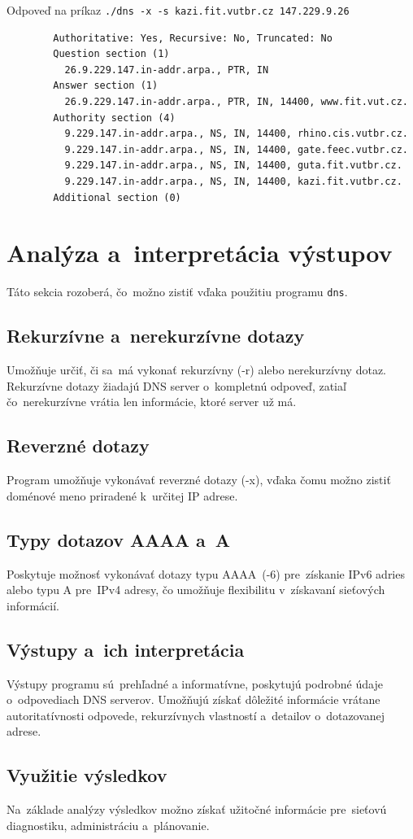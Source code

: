 \documentclass[a4paper, 11pt]{article}
\begin{document}
	\noindent Odpoveď na príkaz \texttt{./dns -x -s kazi.fit.vutbr.cz 147.229.9.26}
	\begin{verbatim}
		Authoritative: Yes, Recursive: No, Truncated: No
		Question section (1)
		  26.9.229.147.in-addr.arpa., PTR, IN
		Answer section (1)
		  26.9.229.147.in-addr.arpa., PTR, IN, 14400, www.fit.vut.cz.
		Authority section (4)
		  9.229.147.in-addr.arpa., NS, IN, 14400, rhino.cis.vutbr.cz.
		  9.229.147.in-addr.arpa., NS, IN, 14400, gate.feec.vutbr.cz.
		  9.229.147.in-addr.arpa., NS, IN, 14400, guta.fit.vutbr.cz.
		  9.229.147.in-addr.arpa., NS, IN, 14400, kazi.fit.vutbr.cz.
		Additional section (0)
	\end{verbatim}
	
	\section{Analýza a~interpretácia výstupov}
	Táto sekcia rozoberá, čo~možno zistiť vďaka použitiu programu \texttt{dns}.
	\subsection{Rekurzívne a~nerekurzívne dotazy}
	Umožňuje určiť, či sa~má vykonať rekurzívny (-r) alebo nerekurzívny dotaz. Rekurzívne dotazy žiadajú DNS server o~kompletnú odpoveď, zatiaľ čo~nerekurzívne vrátia len informácie, ktoré server už má.
	\subsection{Reverzné dotazy}
	Program umožňuje vykonávať reverzné dotazy (-x), vďaka čomu možno zistiť doménové meno priradené k~určitej IP adrese.
	\subsection{Typy dotazov AAAA a~A}
	Poskytuje možnosť vykonávať dotazy typu AAAA~(-6) pre~získanie IPv6 adries alebo typu A pre~IPv4 adresy, čo umožňuje flexibilitu v~získavaní sieťových informácií.
	\subsection{Výstupy a~ich interpretácia}
	Výstupy programu sú~prehľadné a informatívne, poskytujú podrobné údaje o~odpovediach DNS serverov. Umožňujú získať dôležité informácie vrátane autoritatívnosti odpovede, rekurzívnych vlastností a~detailov o~dotazovanej adrese.
	\subsection{Využitie výsledkov}
	Na~základe analýzy výsledkov možno získať užitočné informácie pre~sieťovú diagnostiku, administráciu a~plánovanie.
\end{document}
